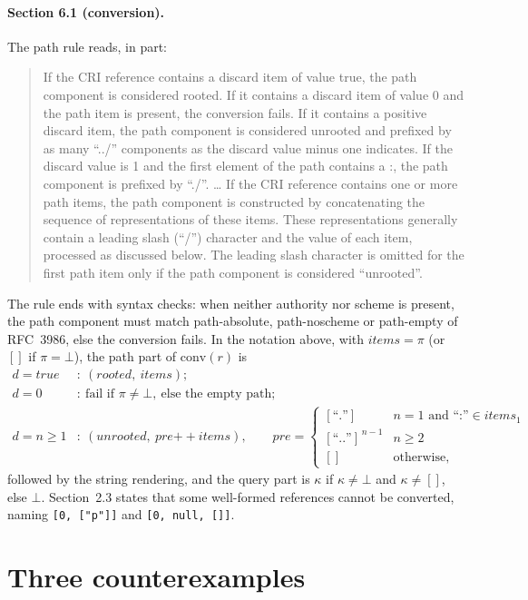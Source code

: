 \documentclass[11pt,a4paper]{article}
\theoremstyle{remark}
\newcommand{\cri}[1]{\texttt{#1}}
\newcommand{\conv}{\mathrm{conv}}
\newcommand{\seq}[1]{[#1]}
\begin{document}
\paragraph{Section 6.1 (conversion).} The path rule reads, in part:
\begin{quote}\small
If the CRI reference contains a discard item of value true, the path component is considered rooted.
If it contains a discard item of value 0 and the path item is present, the conversion fails. If it
contains a positive discard item, the path component is considered unrooted and prefixed by as many
``../'' components as the discard value minus one indicates. If the discard value is 1 and the first
element of the path contains a :, the path component is prefixed by ``./''. \ldots{} If the CRI
reference contains one or more path items, the path component is constructed by concatenating the
sequence of representations of these items. These representations generally contain a leading slash
(``/'') character and the value of each item, processed as discussed below. The leading slash character
is omitted for the first path item only if the path component is considered ``unrooted''.
\end{quote}
The rule ends with syntax checks: when neither authority nor scheme is present, the path component must
match path-absolute, path-noscheme or path-empty of RFC~3986, else the conversion fails.
In the notation above, with $\mathit{items}=\pi$ (or $\seq{}$ if $\pi=\bot$), the path part of
$\conv(r)$ is
\begin{align*}
d=\mathit{true}&:\ (\mathit{rooted},\ \mathit{items});\\
d=0&:\ \text{fail if }\pi\neq\bot,\ \text{else the empty path};\\
d=n\ge1&:\ (\mathit{unrooted},\ \mathit{pre}\mathbin{+\!\!+}\mathit{items}),\qquad
\mathit{pre}=\begin{cases}\seq{\text{``.''}} & n=1 \text{ and ``:''}\in\mathit{items}_1\\ \seq{\text{``..''}}^{\,n-1} & n\ge2\\ \seq{} & \text{otherwise,}\end{cases}
\end{align*}
followed by the string rendering, and the query part is $\kappa$ if $\kappa\neq\bot$ and
$\kappa\neq\seq{}$, else $\bot$.
Section~2.3 states that some well-formed references cannot be converted, naming \cri{[0, ["p"]]} and
\cri{[0, null, []]}.

\section{Three counterexamples}
\label{sec:cex}
\end{document}

